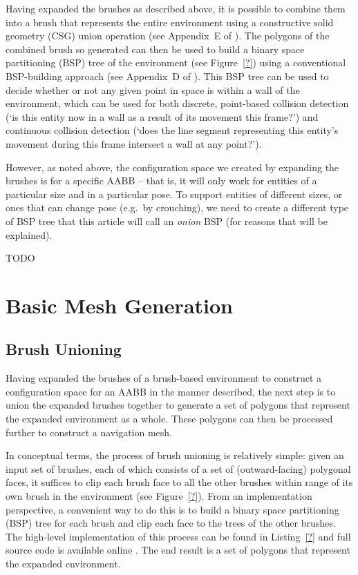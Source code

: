 \documentclass[10pt,twocolumn]{article}
\begin{document}
Having expanded the brushes as described above, it is possible to combine them into a brush that represents the entire environment using a constructive solid geometry (CSG) union operation (see Appendix~E of \cite{golodetz06}). The polygons of the combined brush so generated can then be used to build a binary space partitioning (BSP) tree of the environment (see Figure~\ref{?}) using a conventional BSP-building approach (see Appendix~D of \cite{golodetz06}). This BSP tree can be used to decide whether or not any given point in space is within a wall of the environment, which can be used for both discrete, point-based collision detection (`is this entity now in a wall as a result of its movement this frame?') and continuous collision detection (`does the line segment representing this entity's movement during this frame intersect a wall at any point?').

However, as noted above, the configuration space we created by expanding the brushes is for a specific AABB -- that is, it will only work for entities of a particular size and in a particular pose. To support entities of different sizes, or ones that can change pose (e.g.~by crouching), we need to create a different type of BSP tree that this article will call an \emph{onion} BSP (for reasons that will be explained).

TODO

\fi

\section{Basic Mesh Generation}
\label{sec:meshgen}

\subsection{Brush Unioning}


Having expanded the brushes of a brush-based environment to construct a configuration space for an AABB in the manner described, the next step is to union the expanded brushes together to generate a set of polygons that represent the expanded environment as a whole. These polygons can then be processed further to construct a navigation mesh.

In conceptual terms, the process of brush unioning is relatively simple: given an input set of brushes, each of which consists of a set of (outward-facing) polygonal faces, it suffices to clip each brush face to all the other brushes within range of its own brush in the environment (see Figure~\ref{?}). From an implementation perspective, a convenient way to do this is to build a binary space partitioning (BSP) tree for each brush and clip each face to the trees of the other brushes. The high-level implementation of this process can be found in Listing~\ref{?} and full source code is available online \cite{hesperus}. The end result is a set of polygons that represent the expanded environment.
\end{document}

